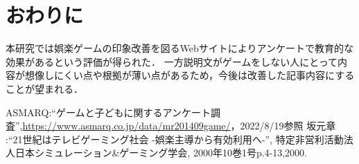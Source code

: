 \documentclass[twocolumn,10pt,a4j]{ltjsarticle}
\begin{document}


\section{おわりに}
本研究では娯楽ゲームの印象改善を図るWebサイトによりアンケートで教育的な効果があるという評価が得られた．
一方説明文がゲームをしない人にとって内容が想像しにくい点や根拠が薄い点があるため，今後は改善した記事内容にすることが望まれる．

\begin{thebibliography}{99}
 ASMARQ:``ゲームと子どもに関するアンケート調査'',\url{https://www.asmarq.co.jp/data/mr201409game/}，2022/8/19参照
 坂元章 :``21世紀はテレビゲーミング社会 -娯楽主導から有効利用ヘ-'', 特定非営利活動法人日本シミュレーション\&ゲーミング学会, 2000年10巻1号p.4-13,2000.
\end{thebibliography}
\end{document}
